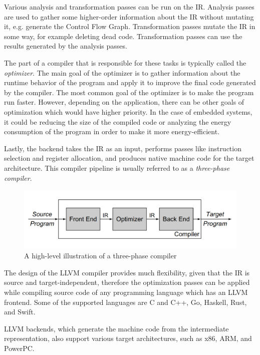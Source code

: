 \documentclass[
  digital, %
  notable,   %
  twoside, %
  nolof,     %
  nolot,     %
]{fithesis3}
\theoremstyle{definition}
\begin{document}
Various analysis and transformation passes can be run on the IR. Analysis passes are used to gather some higher-order information about the IR without mutating it, e.g. generate the Control Flow Graph. Transformation passes mutate the IR in some way, for example deleting dead code. Transformation passes can use the results generated by the analysis passes. 

The part of a compiler that is responsible for these tasks is typically called the \textit{optimizer}. The main goal of the optimizer is to gather information about the runtime behavior of the program and apply it to improve the final code generated by the compiler. The most common goal of the optimizer is to make the program run faster. However, depending on the application, there can be other goals of optimization which would have higher priority. In the case of embedded systems, it could be reducing the size of the compiled code or analyzing the energy consumption of the program in order to make it more energy-efficient\cite{energy_consuption}. 

Lastly, the backend takes the IR as an input, performs passes like instruction selection and register allocation, and produces native machine code for the target architecture. This compiler pipeline is usually referred to as a \textit{three-phase compiler}.

\begin{figure}
    \centering
    \includegraphics[width=\textwidth]{3phase.png}
    \caption{A high-level illustration of a three-phase compiler \cite{eng_comp}}
    \label{fig:3phase}
\end{figure}
    
The design of the LLVM compiler provides much flexibility, given that the IR is source and target-independent, therefore the optimization passes can be applied while compiling source code of any programming language which has an LLVM frontend. Some of the supported languages are C and C++, Go, Haskell, Rust, and Swift. 

LLVM backends, which generate the machine code from the intermediate representation, also support various target architectures, such as x86, ARM, and PowerPC.
\end{document}
